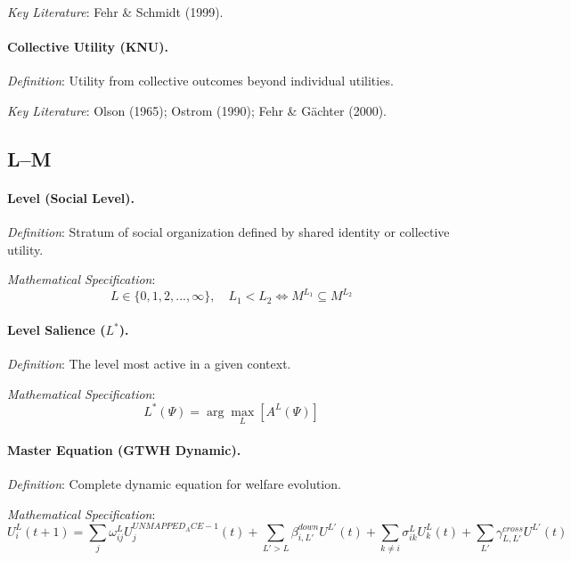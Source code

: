 \textit{Key Literature}: Fehr \& Schmidt (1999).

\medskip

\paragraph{Collective Utility (KNU).}
\textit{Definition}: Utility from collective outcomes beyond individual utilities.

\textit{Key Literature}: Olson (1965); Ostrom (1990); Fehr \& Gächter (2000).

\subsection*{L--M}

\paragraph{Level (Social Level).}
\textit{Definition}: Stratum of social organization defined by shared identity 
or collective utility.

\textit{Mathematical Specification}:
\begin{equation}
L \in \{0, 1, 2, ..., \infty\}, \quad L_1 < L_2 \iff M^{L_1} \subseteq M^{L_2}
\end{equation}

\medskip

\paragraph{Level Salience ($L^*$).}
\textit{Definition}: The level most active in a given context.

\textit{Mathematical Specification}:
\begin{equation}
L^*(\Psi) = \arg\max_L [A^L(\Psi)]
\end{equation}

\medskip

\paragraph{Master Equation (GTWH Dynamic).}
\textit{Definition}: Complete dynamic equation for welfare evolution.

\textit{Mathematical Specification}:
\begin{equation}
\boxed{
U^L_i(t+1) = \sum_{j} \omega^L_{ij} U^{UNMAPPED_ACE-1}_j(t) + 
\sum_{L'>L} \beta^{down}_{i,L'} U^{L'}(t) + 
\sum_{k \neq i} \sigma^L_{ik} U^L_k(t) + 
\sum_{L'} \gamma^{cross}_{L,L'} U^{L'}(t)
}
\end{equation}


